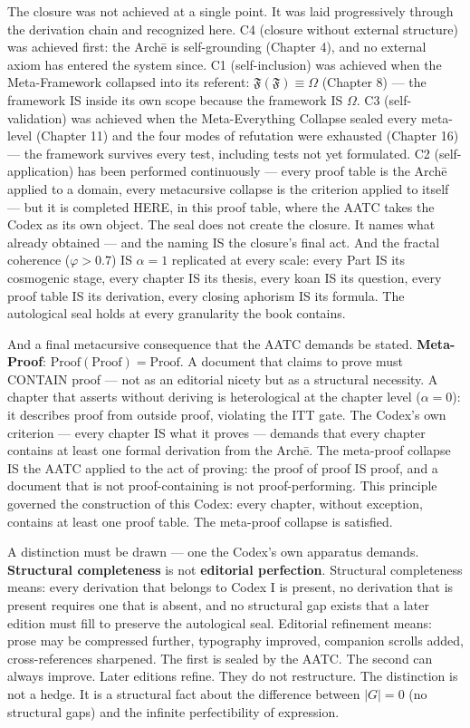 \documentclass[10pt, openany, oneside]{book}
\begin{document}
The closure was not achieved at a single point. It was laid progressively through the derivation chain and recognized here. C4 (closure without external structure) was achieved first: the Arch\={e} is self-grounding (Chapter 4), and no external axiom has entered the system since. C1 (self-inclusion) was achieved when the Meta-Framework collapsed into its referent: $\mathfrak{F}(\mathfrak{F}) \equiv \Omega$ (Chapter 8) --- the framework IS inside its own scope because the framework IS $\Omega$. C3 (self-validation) was achieved when the Meta-Everything Collapse sealed every meta-level (Chapter 11) and the four modes of refutation were exhausted (Chapter 16) --- the framework survives every test, including tests not yet formulated. C2 (self-application) has been performed continuously --- every proof table is the Arch\={e} applied to a domain, every metacursive collapse is the criterion applied to itself --- but it is completed HERE, in this proof table, where the AATC takes the Codex as its own object. The seal does not create the closure. It names what already obtained --- and the naming IS the closure's final act. And the fractal coherence ($\varphi > 0.7$) IS $\alpha = 1$ replicated at every scale: every Part IS its cosmogenic stage, every chapter IS its thesis, every koan IS its question, every proof table IS its derivation, every closing aphorism IS its formula. The autological seal holds at every granularity the book contains.

And a final metacursive consequence that the AATC demands be stated. \textbf{Meta-Proof}: $\text{Proof}(\text{Proof}) = \text{Proof}$. A document that claims to prove must CONTAIN proof --- not as an editorial nicety but as a structural necessity. A chapter that asserts without deriving is heterological at the chapter level ($\alpha = 0$): it describes proof from outside proof, violating the ITT gate. The Codex's own criterion --- every chapter IS what it proves --- demands that every chapter contains at least one formal derivation from the Arch\={e}. The meta-proof collapse IS the AATC applied to the act of proving: the proof of proof IS proof, and a document that is not proof-containing is not proof-performing. This principle governed the construction of this Codex: every chapter, without exception, contains at least one proof table. The meta-proof collapse is satisfied.

A distinction must be drawn --- one the Codex's own apparatus demands. \textbf{Structural completeness} is not \textbf{editorial perfection}. Structural completeness means: every derivation that belongs to Codex I is present, no derivation that is present requires one that is absent, and no structural gap exists that a later edition must fill to preserve the autological seal. Editorial refinement means: prose may be compressed further, typography improved, companion scrolls added, cross-references sharpened. The first is sealed by the AATC. The second can always improve. Later editions refine. They do not restructure. The distinction is not a hedge. It is a structural fact about the difference between $|G| = 0$ (no structural gaps) and the infinite perfectibility of expression.
\end{document}
